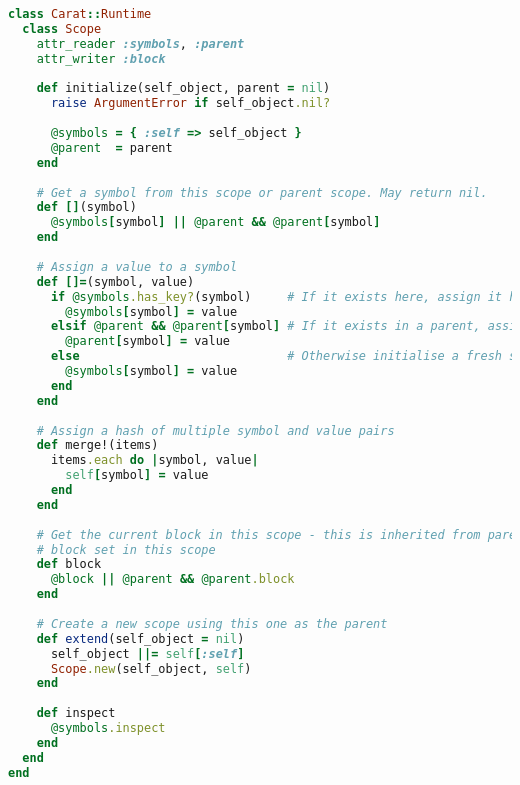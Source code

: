 \begin{lstlisting}[title={\small\Helvetica runtime/scope.rb},language=Ruby]
class Carat::Runtime
  class Scope
    attr_reader :symbols, :parent
    attr_writer :block
    
    def initialize(self_object, parent = nil)
      raise ArgumentError if self_object.nil?
      
      @symbols = { :self => self_object }
      @parent  = parent
    end
    
    # Get a symbol from this scope or parent scope. May return nil.
    def [](symbol)
      @symbols[symbol] || @parent && @parent[symbol]
    end
    
    # Assign a value to a symbol
    def []=(symbol, value)
      if @symbols.has_key?(symbol)     # If it exists here, assign it here
        @symbols[symbol] = value
      elsif @parent && @parent[symbol] # If it exists in a parent, assign it there
        @parent[symbol] = value
      else                             # Otherwise initialise a fresh symbol here
        @symbols[symbol] = value
      end
    end
    
    # Assign a hash of multiple symbol and value pairs
    def merge!(items)
      items.each do |symbol, value|
        self[symbol] = value
      end
    end
    
    # Get the current block in this scope - this is inherited from parent scopes if there is no
    # block set in this scope
    def block
      @block || @parent && @parent.block
    end
    
    # Create a new scope using this one as the parent
    def extend(self_object = nil)
      self_object ||= self[:self]
      Scope.new(self_object, self)
    end
    
    def inspect
      @symbols.inspect
    end
  end
end

\end{lstlisting}
